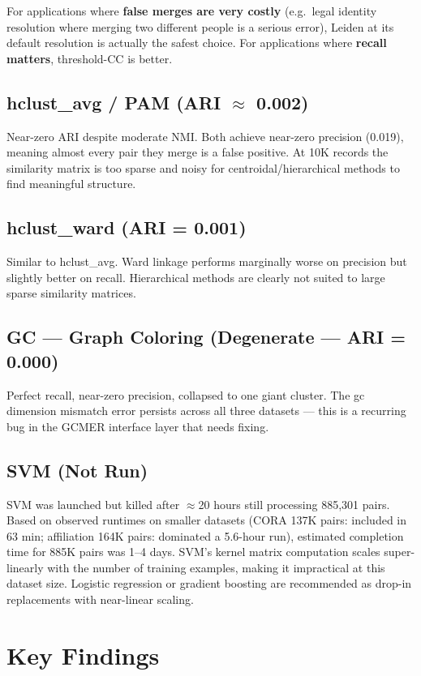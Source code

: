 \documentclass[11pt, a4paper]{article}
\begin{document}
For applications where \textbf{false merges are very costly} (e.g.\ legal identity
resolution where merging two different people is a serious error), Leiden at its default
resolution is actually the safest choice. For applications where \textbf{recall matters},
threshold-CC is better.

\subsection*{hclust\_avg / PAM (ARI $\approx$ 0.002)}
Near-zero ARI despite moderate NMI. Both achieve near-zero precision (0.019), meaning
almost every pair they merge is a false positive. At 10K records the similarity matrix
is too sparse and noisy for centroidal/hierarchical methods to find meaningful structure.

\subsection*{hclust\_ward (ARI = 0.001)}
Similar to hclust\_avg. Ward linkage performs marginally worse on precision but slightly
better on recall. Hierarchical methods are clearly not suited to large sparse similarity
matrices.

\subsection*{GC --- Graph Coloring (Degenerate --- ARI = 0.000)}
Perfect recall, near-zero precision, collapsed to one giant cluster. The gc dimension
mismatch error persists across all three datasets --- this is a recurring bug in the
GCMER interface layer that needs fixing.

\subsection*{SVM (Not Run)}
SVM was launched but killed after $\approx$20 hours still processing 885,301 pairs.
Based on observed runtimes on smaller datasets (CORA 137K pairs: included in 63 min;
affiliation 164K pairs: dominated a 5.6-hour run), estimated completion time for 885K
pairs was 1--4 days. SVM's kernel matrix computation scales super-linearly with the
number of training examples, making it impractical at this dataset size. Logistic
regression or gradient boosting are recommended as drop-in replacements with
near-linear scaling.

\section{Key Findings}
\end{document}
